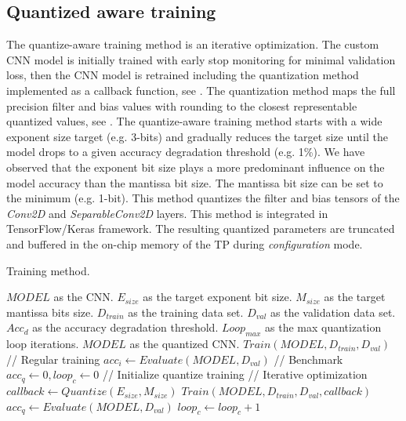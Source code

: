 \subsection{Quantized aware training}
The quantize-aware training method is an iterative optimization. The custom CNN model is initially trained with early stop monitoring for minimal validation loss, then the CNN model is retrained including the quantization method implemented as a callback function, see . The quantization method maps the full precision filter and bias values with rounding to the closest representable quantized values, see . The quantize-aware training method starts with a wide exponent size target (e.g. 3-bits) and gradually reduces the target size until the model drops to a given accuracy degradation threshold (e.g. 1\%). We have observed that the exponent bit size plays a more predominant influence on the model accuracy than the mantissa bit size. The mantissa bit size can be set to the minimum (e.g. 1-bit). This method quantizes the filter and bias tensors of the \emph{Conv2D} and \emph{SeparableConv2D} layers. This method is integrated in TensorFlow/Keras framework. The resulting quantized parameters are truncated and buffered in the on-chip memory of the TP during \emph{configuration} mode.
\begin{algorithm}[h!]
	\label{alg:training}
	\caption{Training method.}
	\begin{algorithmic}
		\SetAlgoLined
		\renewcommand{\algorithmicrequire}{\textbf{input:}}
		\renewcommand{\algorithmicensure}{\textbf{output:}}
		\REQUIRE $MODEL$ as the CNN.
		\REQUIRE $E_{size}$ as the target exponent bit size.
		\REQUIRE $M_{size}$ as the target mantissa bits size.
		\REQUIRE $D_{train}$ as the training data set.
		\REQUIRE $D_{val}$ as the validation data set.
		\REQUIRE $Acc_d$ as the accuracy degradation threshold.
		\REQUIRE $Loop_{max}$ as the max quantization loop iterations.
		\ENSURE $MODEL$ as the quantized CNN.
		\STATE $Train(MODEL, D_{train}, D_{val})$ // Regular training
		\STATE $acc_i \gets Evaluate(MODEL, D_{val})$ // Benchmark
		\STATE $acc_q \gets 0, loop_c \gets 0$ // Initialize quantize training
		\STATE // Iterative optimization
		\STATE $callback \gets Quantize(E_{size}, M_{size})$
		\STATE $Train(MODEL, D_{train}, D_{val}, callback)$
		\STATE $acc_q \gets Evaluate(MODEL, D_{val})$
		\STATE $loop_c \gets loop_c + 1$
		\ENDWHILE
	\end{algorithmic}
\end{algorithm}
